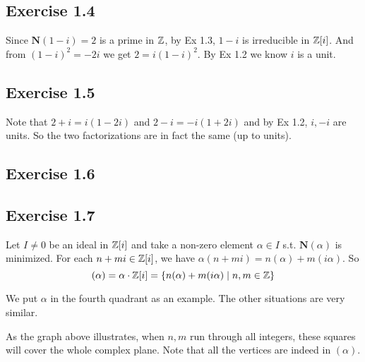 \documentclass[../Marcus.tex]{subfiles}
\begin{document}
\subsection*{Exercise 1.4}

Since $\mathbf{N}(1-i)=2$ is a prime in $\mathbb{Z}$, by Ex 1.3, $1-i$ is irreducible in $\mathbb{Z}[i]$. And from $(1-i)^2=-2i$ we get $2=i(1-i)^2$. By Ex 1.2 we know $i$ is a unit.

\subsection*{Exercise 1.5}

Note that $2+i=i(1-2i)$ and $2-i=-i(1+2i)$ and by Ex 1.2, $i,-i$ are units. So the two factorizations are in fact the same (up to units).

\subsection*{Exercise 1.6}

\subsection*{Exercise 1.7}
Let $I\neq 0$ be an ideal in $\mathbb{Z}[i]$ and take a non-zero element $\alpha\in I$ s.t. $\mathbf{N}(\alpha)$ is minimized. For each $n+mi\in\mathbb{Z}[i]$, we have $\alpha(n+mi)=n(\alpha)+m(i\alpha)$. So $$(\alpha)=\alpha\cdot\mathbb{Z}[i]=\{n(\alpha)+m(i\alpha)\mid n,m\in\mathbb{Z}\}$$

We put $\alpha$ in the fourth quadrant as an example. The other situations are very similar.

\begin{center}
\end{center}
As the graph above illustrates, when $n,m$ run through all integers, these squares will cover the whole complex plane. Note that all the vertices are indeed in $(\alpha)$.
\end{document}
